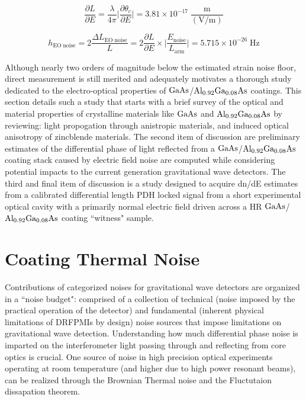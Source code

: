 \begin{equation*}
    \frac{\partial L}{\partial E} = \frac{\lambda}{4 \pi} \bigg| \frac{\partial \theta_c}{\partial E} \bigg| = 3.81 \times 10^{-17} \; \frac{\mathrm{m}}{(\mathrm{V/m})}
\end{equation*}

\begin{equation}
h_\mathrm{EO\; noise} = 2\frac{\Delta L_\mathrm{EO \; noise}}{L} = 2\frac{\partial L}{\partial E} \times \bigg| \frac{E_\mathrm{noise}}{L_\mathrm{arm}} \bigg| = 5.715 \times 10^{-26} \; \mathrm{Hz}
\end{equation}

Although nearly two orders of magnitude below the estimated strain noise floor, direct measurement is still merited and adequately motivates a thorough study dedicated to the electro-optical properties of $\mathrm{GaAs}$/$\mathrm{Al_{0.92}Ga_{0.08}As}$ coatings. This section details such a study that starts with a brief survey of the optical and material properties of crystalline materials like $\mathrm{GaAs}$ and $\mathrm{Al_{0.92}Ga_{0.08}As}$ by reviewing: light propogation through anistropic materials, and induced optical anisotropy of zincblende materials. The second item of discussion are preliminary estimates of the differential phase of light reflected from a $\mathrm{GaAs}$/$\mathrm{Al_{0.92}Ga_{0.08}As}$ coating stack caused by electric field noise are computed while considering potential impacts to the current generation gravitational wave detectors. The third and final item of discussion is a study designed to acquire dn/dE estimates from a calibrated differential length PDH locked signal from a short experimental optical cavity with a primarily normal electric field driven across a HR $\mathrm{GaAs}$/$\mathrm{Al_{0.92}Ga_{0.08}As}$ coating ``witness" sample.

\section{Coating Thermal Noise}
Contributions of categorized noises for gravitational wave detectors are organized in a ``noise budget": comprised of a collection of technical (noise imposed by the practical operation of the detector) and fundamental (inherent physical limitations of DRFPMIs by design) noise sources that impose limitations on gravitational wave detection. Understanding how much differential phase noise is imparted on the interferometer light passing through and reflecting from core optics is crucial.
One source of noise in high precision optical experiments operating at room temperature (and higher due to high power resonant beams), can be realized through the Brownian Thermal noise and the Fluctutaion dissapation theorem. 

